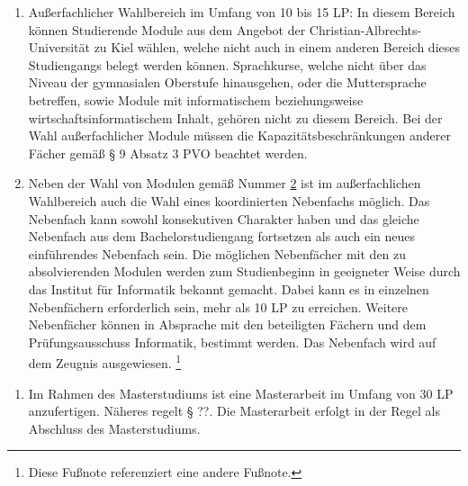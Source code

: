 \documentclass{article}\usepackage{helvet}\renewcommand{\familydefault}{\sfdefault}\usepackage[letterpaper,top=2cm,bottom=2cm,left=3cm,right=3cm,marginparwidth=1.75cm]{geometry}\usepackage[colorlinks=true,allcolors=red]{hyperref}\usepackage{enumitem}\usepackage{tabularx}\usepackage[T1]{fontenc}\setlist[enumerate,1]{label=\arabic*., left=0pt}\setlist[enumerate,2]{label=\alph*., left=0.5em}\setlist[enumerate,3]{label=\alph*\alph*., left=1em}\setlist[enumerate,4]{label=-, left=1.5em}\setlist{nosep}\setlength{\parindent}{0pt}
\begin{document}
\begin{enumerate}[start=2,label=(\arabic*)]
{\begin{enumerate}[label=\arabic*.]
{\begin{enumerate}[label=\alph*)]
			\end{enumerate}
Es müssen die folgenden Bedingungen bei den Modulen gemäß den Buchstaben \hyperlink{numb}{b} bis \hyperlink{nume}{e} eingehalten werden:
			\begin{enumerate}[label=\alph*)]
				\item{Ein oder zwei Masterseminare.}
				\item{Ein oder zwei Masterprojekte oder eine Projektgruppe.}
				\item{Höchstens ein Forschungsprojekt.}
				\item{Der Gesamtumfang der Module gemäß den Buchstaben \hyperlink{numb}{b} bis \hyperlink{nume}{e} ist höchstens 25 LP.}
			\end{enumerate}
}
			\item{\hypertarget{num2}{}Außerfachlicher Wahlbereich im Umfang von 10 bis 15 LP: In diesem Bereich können Studierende Module aus dem Angebot der Christian-Albrechts-Universität zu Kiel wählen, welche nicht auch in einem anderen Bereich dieses Studiengangs belegt werden können. Sprachkurse, welche nicht über das Niveau der gymnasialen Oberstufe hinausgehen, oder die Muttersprache betreffen, sowie Module mit informatischem beziehungsweise wirtschaftsinformatischem Inhalt, gehören nicht zu diesem Bereich. Bei der Wahl außerfachlicher Module müssen die Kapazitätsbeschränkungen anderer Fächer gemäß § 9 Absatz 3 PVO beachtet werden.}
			\item{Neben der Wahl von Modulen gemäß Nummer \hyperlink{num2}{2} ist im außerfachlichen Wahlbereich auch die Wahl eines koordinierten Nebenfachs möglich. Das Nebenfach kann sowohl konsekutiven Charakter haben und das gleiche Nebenfach aus dem Bachelorstudiengang fortsetzen als auch ein neues einführendes Nebenfach sein. Die möglichen Nebenfächer mit den zu absolvierenden Modulen werden zum Studienbeginn in geeigneter Weise durch das Institut für Informatik bekannt gemacht. Dabei kann es in einzelnen Nebenfächern erforderlich sein, mehr als 10 LP zu erreichen. Weitere Nebenfächer können in Absprache mit den beteiligten Fächern und dem Prüfungsausschuss Informatik, bestimmt werden. Das Nebenfach wird auf dem Zeugnis ausgewiesen. \footnote{\hypertarget{fn1}{}\label{fn1}Diese Fußnote referenziert eine andere Fußnote.}}
		\end{enumerate}
}
	\end{enumerate}

	\begin{enumerate}[start=3,label=(\arabic*)]
		\item{Im Rahmen des Masterstudiums ist eine Masterarbeit im Umfang von 30 LP anzufertigen. Näheres regelt § {\Large ??}. Die Masterarbeit erfolgt in der Regel als Abschluss des Masterstudiums.}
	\end{enumerate}
\end{document}
